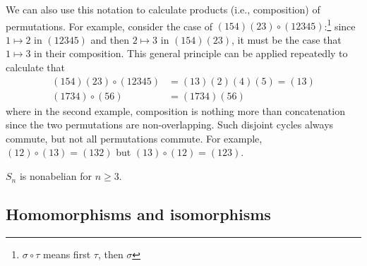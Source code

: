 \documentclass{article}
\theoremstyle{plain}
\begin{document}
We can also use this notation to calculate products (i.e., composition) of permutations. For example, consider the case of $(154)(23) \circ (12345)$:\footnote{$\sigma \circ \tau$ means first $\tau$, then $\sigma$} since $1 \mapsto 2$ in $(12345)$ and then $2\mapsto 3$ in $(154)(23)$, it must be the case that $1\mapsto 3$ in their composition. This general principle can be applied repeatedly to calculate that
\begin{align*}
(154)(23) \circ (12345) &= (13)(2)(4)(5) = (13) \\
(1734) \circ (56) &= (1734)(56)
\end{align*}
where in the second example, composition is nothing more than concatenation since the two permutations are non-overlapping. Such disjoint cycles always commute, but not all permutations commute. For example, $(12) \circ (13) = (132)$ but $(13) \circ (12) = (123)$.
\begin{theorem}{}{}
$S_n$ is nonabelian for $n \ge 3$.
\end{theorem}
\subsection{Homomorphisms and isomorphisms}
\end{document}

